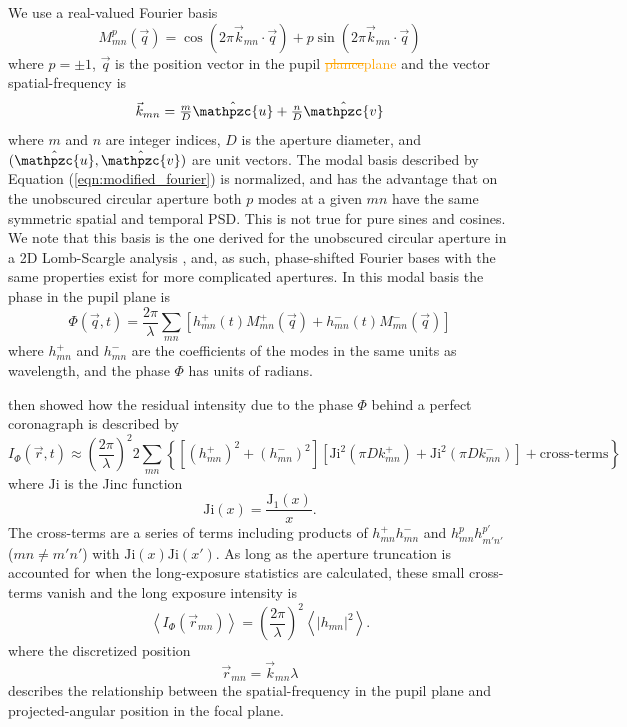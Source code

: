 \documentclass[10pt,preprint]{aastex631}
\newcommand{\ogadd}[1]{\textcolor{orange}{#1}}
\newcommand{\ogrmv}[1]{\textcolor{orange}{\sout{#1}}}
\newcommand{\Ji}{\mathrm{Ji}}
\begin{document}
We use a real-valued Fourier basis
\begin{equation}
M_{mn}^p(\vec{q}) = \cos(2\pi \vec{k}_{mn} \cdot \vec{q}) + p  \sin(2\pi \vec{k}_{mn} \cdot \vec{q})
\label{eqn:modified_fourier}
\end{equation}
where $p=\pm 1$, $\vec{q}$ is the position vector in the pupil \ogrmv{plance}\ogadd{plane} and the vector spatial-frequency is 
\begin{equation}
\textstyle\vec{k}_{mn} = \textstyle\frac{m}{D} \hat{\mathpzc{u}} + \textstyle\frac{n}{D} \hat{\mathpzc{v}}
\label{eqn:kq_def}
\end{equation}
where $m$ and $n$ are integer indices, $D$ is the aperture diameter, and $(\hat{\mathpzc{u}},\hat{\mathpzc{v}})$ are unit vectors.  The modal basis described by Equation (\ref{eqn:modified_fourier}) is normalized, and has the advantage that on the unobscured circular aperture both $p$ modes at a given $mn$ have the same symmetric spatial and temporal PSD.  This is not true for pure sines and cosines.  We note that this basis is the one derived for the unobscured circular aperture in a 2D Lomb-Scargle analysis \citep{2020arXiv200110200S}, and, as such, phase-shifted Fourier bases with the same properties exist for more complicated apertures.  In this modal basis the phase in the pupil plane is
\begin{equation}
\Phi(\vec{q},t) = \frac{2\pi}{\lambda} \sum\limits_{mn} \left[ h_{mn}^{+}(t) M_{mn}^{+}(\vec{q}) + h_{mn}^{-}(t) M_{mn}^{-}(\vec{q})\right]
\label{eqn:phi_expansion}
\end{equation}
where $h_{mn}^{+}$ and $h_{mn}^{-}$ are the coefficients of the modes in the same units as wavelength, and the phase $\Phi$ has units of radians.

\citet{2018JATIS...4a9001M} then showed how the residual intensity due to the phase $\Phi$ behind a perfect coronagraph is described by
\begin{equation}
I_\Phi(\vec{r},t) \approx \left(\frac{2\pi}{\lambda}\right)^2 2 \sum_{mn} \left\{  \left[ (h_{mn}^{+})^2 + (h_{mn}^{-})^2 \right] \left[ \Ji^2(\pi D k_{mn}^+) +\Ji^2(\pi D k_{mn}^-)\right] + \mbox{cross-terms} \right\}
\label{eqn:cross_terms}
\end{equation}
where $\Ji$ is the Jinc function
\begin{equation}
\Ji(x) = \frac{\mathrm{J}_1(x)}{x}.
\end{equation}
The cross-terms are a series of terms including products of $h_{mn}^+h_{mn}^-$ and $h_{mn}^ph_{m'n'}^{p'}$ ($mn \neq m'n'$) with $\Ji(x)\Ji(x')$. As long as the aperture truncation is accounted for when the long-exposure statistics are calculated,  these small cross-terms vanish and the long exposure intensity is 
\begin{equation}
\left< I_\Phi(\vec{r}_{mn}) \right> =  \left(\frac{2\pi}{\lambda}\right)^2\left< |h_{mn}|^2 \right> .
\label{eqn:contrast_h2}
\end{equation}
where the discretized position 
\begin{equation}
\vec{r}_{mn} = \vec{k}_{mn} \lambda
\end{equation}
describes the relationship between the spatial-frequency in the pupil plane and projected-angular position in the focal plane.
\end{document}
